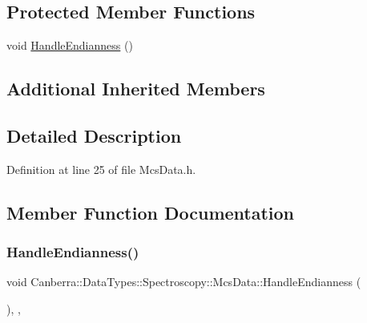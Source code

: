 \subsection*{Protected Member Functions}
\begin{DoxyCompactItemize}
\item 
void \hyperlink{class_canberra_1_1_data_types_1_1_spectroscopy_1_1_mcs_data_a7b3b725c711c1720c6c434d269f8664c_a7b3b725c711c1720c6c434d269f8664c}{Handle\+Endianness} ()
\end{DoxyCompactItemize}
\subsection*{Additional Inherited Members}


\subsection{Detailed Description}


Definition at line 25 of file Mcs\+Data.\+h.



\subsection{Member Function Documentation}
\mbox{\label{class_canberra_1_1_data_types_1_1_spectroscopy_1_1_mcs_data_a7b3b725c711c1720c6c434d269f8664c_a7b3b725c711c1720c6c434d269f8664c}} 
\subsubsection{\texorpdfstring{Handle\+Endianness()}{HandleEndianness()}}
{\footnotesize\ttfamily void Canberra\+::\+Data\+Types\+::\+Spectroscopy\+::\+Mcs\+Data\+::\+Handle\+Endianness (\begin{DoxyParamCaption}{ }\end{DoxyParamCaption})\hspace{0.3cm}{\ttfamily [inline]}, {\ttfamily [protected]}, {\ttfamily [virtual]}}


